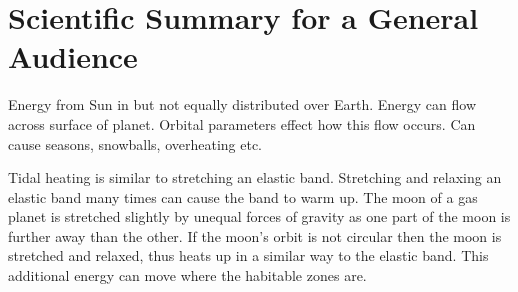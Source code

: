 \documentclass[12pt, onecolumn]{revtex4-2}    %
\begin{document}
\clearpage

\section*{Scientific Summary for a General Audience}

Energy from Sun in but not equally distributed over Earth.
Energy can flow across surface of planet.
Orbital parameters effect how this flow occurs.
Can cause seasons, snowballs, overheating etc.

Tidal heating is similar to stretching an elastic band.
Stretching and relaxing an elastic band many times can cause the band to warm up.
The moon of a gas planet is stretched slightly by unequal forces of gravity as one part of the moon is further away than the other.
If the moon's orbit is not circular then the moon is stretched and relaxed, thus heats up in a similar way to the elastic band.
This additional energy can move where the habitable zones are.
\end{document}
